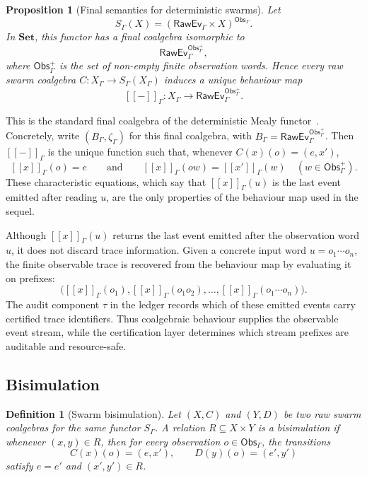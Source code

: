 \documentclass[a4paper,fleqn]{cas-sc}
\newtheorem{definition}{Definition}
\newtheorem{proposition}{Proposition}
\newcommand{\Set}{\mathbf{Set}}
\newcommand{\sem}[1]{\left[\!\left[#1\right]\!\right]}
\newcommand{\Obs}{\mathsf{Obs}}
\newcommand{\RawEv}{\mathsf{RawEv}}
\begin{document}
\begin{proposition}[Final semantics for deterministic swarms]\label{prop:final-swarm-semantics}
Let
\[
  S_{\Gamma}(X)=(\RawEv_{\Gamma}\times X)^{\Obs_{\Gamma}}.
\]
In \(\Set\), this functor has a final coalgebra isomorphic to
\[
  \RawEv_{\Gamma}^{\Obs_{\Gamma}^{+}},
\]
where \(\Obs_{\Gamma}^{+}\) is the set of non-empty finite observation words. Hence every raw swarm coalgebra \(C:X_{\Gamma}\to S_{\Gamma}(X_{\Gamma})\) induces a unique behaviour map
\[
  \sem{-}_{\Gamma}:X_{\Gamma}\to\RawEv_{\Gamma}^{\Obs_{\Gamma}^{+}}.
\]
\end{proposition}

This is the standard final coalgebra of the deterministic Mealy
functor~\cite{rutten2000,bonsangue2008,jacobs2016}. Concretely,
write \((B_{\Gamma},\zeta_{\Gamma})\) for this final coalgebra, with
\(B_{\Gamma}=\RawEv_{\Gamma}^{\Obs_{\Gamma}^{+}}\). Then
\(\sem{-}_{\Gamma}\) is the unique function such that, whenever
\(C(x)(o)=(e,x')\),
\[
  \sem{x}_{\Gamma}(o)=e
  \qquad\text{and}\qquad
  \sem{x}_{\Gamma}(ow)=\sem{x'}_{\Gamma}(w)
  \quad(w\in\Obs_{\Gamma}^{+}).
\]
These characteristic equations, which say that \(\sem{x}_{\Gamma}(u)\) is the last event emitted after reading \(u\), are the only properties of the behaviour map used in the sequel.

Although \(\sem{x}_{\Gamma}(u)\) returns the last event emitted after the observation word \(u\), it does not discard trace information. Given a concrete input word \(u=o_1\cdots o_n\), the finite observable trace is recovered from the behaviour map by evaluating it on prefixes:
\[
  \bigl(\sem{x}_{\Gamma}(o_1),
  \sem{x}_{\Gamma}(o_1o_2),\ldots,
  \sem{x}_{\Gamma}(o_1\cdots o_n)\bigr).
\]
The audit component \(\tau\) in the ledger records which of these emitted events carry certified trace identifiers. Thus coalgebraic behaviour supplies the observable event stream, while the certification layer determines which stream prefixes are auditable and resource-safe.

\subsection{Bisimulation}

\begin{definition}[Swarm bisimulation]
Let \((X,C)\) and \((Y,D)\) be two raw swarm coalgebras for the same functor \(S_{\Gamma}\). A relation \(R\subseteq X\times Y\) is a bisimulation if whenever \((x,y)\in R\), then for every observation \(o\in\Obs_{\Gamma}\), the transitions
\[
  C(x)(o)=(e,x'),
  \qquad
  D(y)(o)=(e',y')
\]
satisfy \(e=e'\) and \((x',y')\in R\).
\end{definition}
\end{document}
